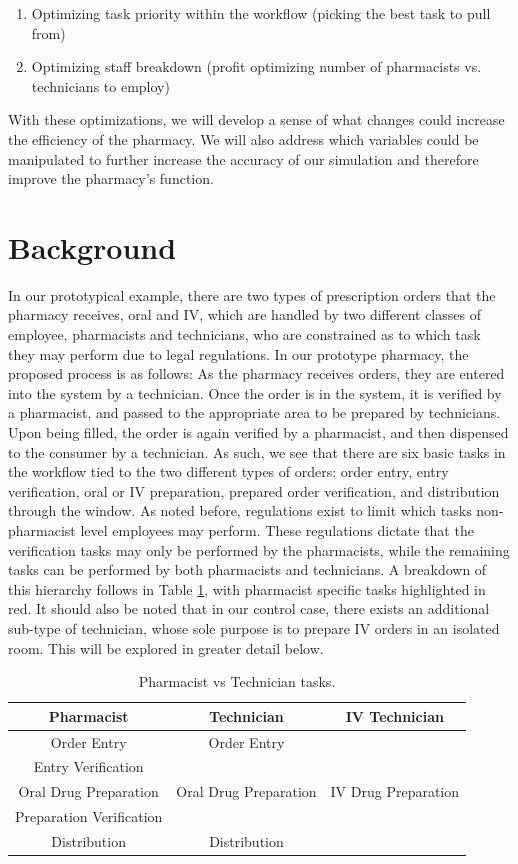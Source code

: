 \documentclass[10pt]{report}            %
\begin{document}
\begin{enumerate}
\item Optimizing task priority within the workflow (picking the best task to pull from)
\item Optimizing staff breakdown (profit optimizing number of pharmacists vs. technicians to employ)
\end{enumerate}
With these optimizations, we will develop a sense of what changes could increase the efficiency of the pharmacy. We will also address which variables could be manipulated to further increase the accuracy of our simulation and therefore improve the pharmacy's function.
\section*{Background}
In our prototypical example, there are two types of prescription orders that the pharmacy receives, oral and IV, which are handled by two different classes of employee, pharmacists and technicians, who are constrained as to which task they may perform due to legal regulations. In our prototype pharmacy, the proposed process is as follows: As the pharmacy receives orders, they are entered into the system by a technician. Once the order is in the system, it is verified by a pharmacist, and passed to the appropriate area to be prepared by technicians. Upon being filled, the order is again verified by a pharmacist, and then dispensed to the consumer by a technician. As such, we see that there are six basic tasks in the workflow tied to the two different types of orders: order entry, entry verification, oral or IV preparation, prepared order verification, and distribution through the window. As noted before, regulations exist to limit which tasks non-pharmacist level employees may perform. These regulations dictate that the verification tasks may only be performed by the pharmacists, while the remaining tasks can be performed by both pharmacists and technicians. A breakdown of this hierarchy follows in Table \ref{table:tasks}, with pharmacist specific tasks highlighted in red. It should also be noted that in our control case, there exists an additional sub-type of technician, whose sole purpose is to prepare IV orders in an isolated room. This will be explored in greater detail below.
\begin{table}[H]
\centering
\begin{tabular}{|c||c||c|}
\hline
Pharmacist & Technician & IV Technician\\\hline\hline
Order Entry & Order Entry & \cellcolor{black}\\\hline
\cellcolor{red!25}Entry Verification &\cellcolor{black}& \cellcolor{black}\\\hline
Oral Drug Preparation & Oral Drug Preparation & \cellcolor{blue!25}IV Drug Preparation\\\hline
\cellcolor{red!25}Preparation Verification &\cellcolor{black}&\cellcolor{black}\\\hline
Distribution & Distribution&\cellcolor{black}\\\hline
\end{tabular}
\caption{Pharmacist vs Technician tasks.}
\label{table:tasks}
\end{table}
\end{document}
